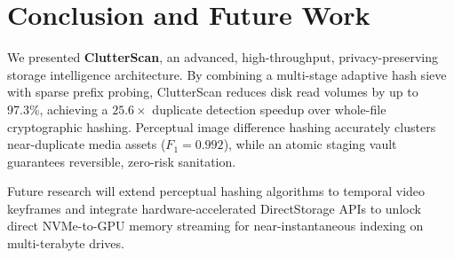 \documentclass[journal,compsoc,10pt,twocolumn]{IEEEtran}
\begin{document}
\section{Conclusion and Future Work}
\label{sec:conclusion}
We presented \textbf{ClutterScan}, an advanced, high-throughput, privacy-preserving storage intelligence architecture. By combining a multi-stage adaptive hash sieve with sparse prefix probing, ClutterScan reduces disk read volumes by up to 97.3\%, achieving a $25.6\times$ duplicate detection speedup over whole-file cryptographic hashing. Perceptual image difference hashing accurately clusters near-duplicate media assets ($F_1 = 0.992$), while an atomic staging vault guarantees reversible, zero-risk sanitation.

Future research will extend perceptual hashing algorithms to temporal video keyframes and integrate hardware-accelerated DirectStorage APIs to unlock direct NVMe-to-GPU memory streaming for near-instantaneous indexing on multi-terabyte drives.
\end{document}
